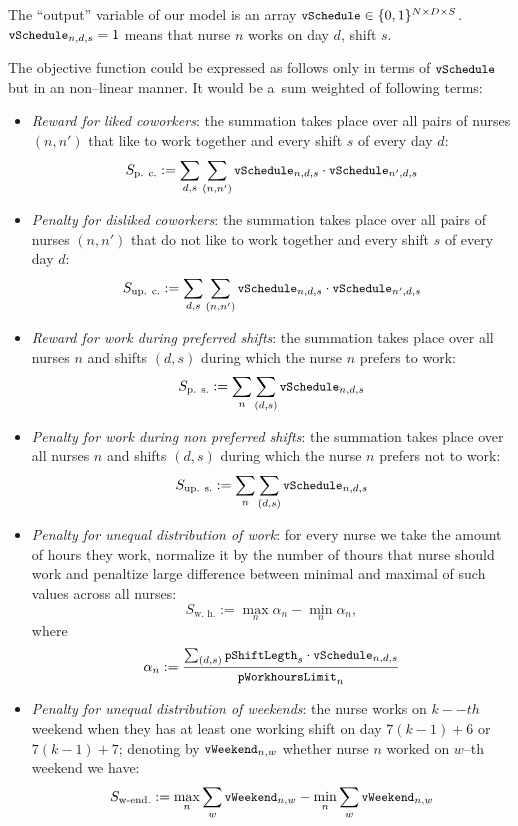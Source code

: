 The ``output'' variable of our model is an array $\texttt{\small vSchedule} \in \{0, 1\}^{N \times D \times S}$. $\texttt{\small vSchedule}_{n, d, s} = 1$ means that nurse $n$ works on day $d$, shift $s$.

The objective function could be expressed as follows only in terms of $\texttt{\small vSchedule}$ but in an non--linear manner. It would be a~sum weighted of following terms:

\begin{itemize}
    \item \textit{Reward for liked coworkers}: the summation takes place over all pairs of nurses $(n, n')$ that like to work together and every shift $s$ of every day $d$:
    \[ S_\text{p. c.} := \sum_{d,s} \sum_{(n, n')} \texttt{\small vSchedule}_{n,d,s} \cdot \texttt{\small vSchedule}_{n',d,s} \]
    \item \textit{Penalty for disliked coworkers}: the summation takes place over all pairs of nurses $(n, n')$ that do not like to work together and every shift $s$ of every day $d$:
    \[ S_\text{up. c.} := \sum_{d,s} \sum_{(n, n')} \texttt{\small vSchedule}_{n,d,s} \cdot \texttt{\small vSchedule}_{n',d,s} \]
    \item \textit{Reward for work during preferred shifts}: the summation takes place over all nurses $n$ and shifts $(d, s)$ during which the nurse $n$ prefers to work:
    \[ S_\text{p. s.} := \sum_{n} \sum_{(d, s)} \texttt{\small vSchedule}_{n,d,s} \]
    \item \textit{Penalty for work during non preferred shifts}: the summation takes place over all nurses $n$ and shifts $(d, s)$ during which the nurse $n$ prefers not to work:
    \[ S_\text{up. s.} := \sum_{n} \sum_{(d, s)} \texttt{\small vSchedule}_{n,d,s} \]
    \item \textit{Penalty for unequal distribution of work}: for every nurse we take the amount of hours they work, normalize it by the number of thours that nurse should work and penaltize large difference between minimal and maximal of such values across all nurses:
    \[ S_\text{w. h.} := \max_{n} \alpha_n - \min_n \alpha_n, \]
    where 
    \[ \alpha_n := \frac{\sum_{(d, s)} \texttt{\small pShiftLegth}_s \cdot \texttt{\small vSchedule}_{n, d, s}}{\texttt{\small pWorkhoursLimit}_n} \]
    \item \textit{Penalty for unequal distribution of weekends}: the nurse works on $k--th$ weekend when they has at least one working shift on day $7(k-1) + 6$ or $7(k-1) + 7$; denoting by $\texttt{\small vWeekend}_{n, w}$ whether nurse $n$ worked on $w$--th weekend we have:
    \[ S_\text{w-end.} := \max_n \sum_w \texttt{\small vWeekend}_{n, w} - \min_n \sum_w \texttt{\small vWeekend}_{n, w} \]
\end{itemize}

